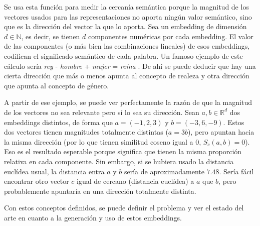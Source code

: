 Se usa esta función para medir la cercanía semántica porque la magnitud de los vectores usados para las representaciones no aporta
ningún valor semántico, sino que es la dirección del vector la que lo aporta. Sea un embedding de dimensión $d\in\mathbb{N}$, es decir,
se tienen $d$ componentes numéricas por cada embedding. El valor de las componentes (o más bien las combinaciones lineales) de esos embeddings,
codifican el significado semántico de cada palabra. Un famoso ejemplo de este cálculo sería \emph{rey} - \emph{hombre} + \emph{mujer} = \emph{reina} \cite{drozd-etal-2016-word}.
De ahí se puede deducir que hay una cierta dirección que más o menos apunta al concepto de realeza y otra dirección que apunta al concepto de género.

A partir de ese ejemplo, se puede ver perfectamente la razón de que la magnitud de los vectores no sea relevante pero sí lo sea su dirección. Sean $a,b\in\mathbb{R}^d$ dos embeddings
distintos, de forma que $a=(-1, 2, 3)$ y $b=(-3, 6, -9)$. Estos dos vectores tienen magnitudes totalmente distintas ($a=3b$), pero apuntan hacia la misma dirección
(por lo que tienen similitud coseno igual a 0, $S_c(a,b)=0$). Eso es el resultado esperable porque significa que tienen la misma proporción relativa en cada componente.
Sin embargo, si se hubiera usado la distancia euclídea usual, la distancia entra $a$ y $b$ sería de aproximadamente $7.48$. Sería fácil encontrar otro vector $c$ igual de cercano (distancia euclídea) a $a$
que $b$, pero probablemente apuntaría en una dirección totalmente distinta.

Con estos conceptos definidos, se puede definir el problema y ver el estado del arte en cuanto a la generación y uso de estos embeddings.